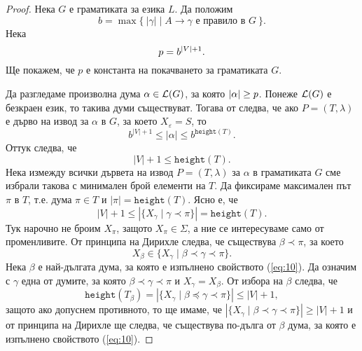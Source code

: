 \begin{proof}
  Нека $G$ е граматиката за езика $L$. Да положим
  \[b = \max\{\ |\gamma| \mid A \to \gamma \text{ е правило в }G\ \}.\]
  Нека
  \[p = b^{\vert{V}\vert + 1}.\]
  Ще покажем, че $p$ е константа на покачването за граматиката $G$.
  
  Да разгледаме произволна дума $\alpha \in \mathcal{L}(G)$, за която $\vert{\alpha}\vert \geq p$.
  Понеже $\mathcal{L}(G)$ е безкраен език, то такива думи съществуват.
  Тогава от  следва, че ако $P = (T,\lambda)$ е дърво на извод за $\alpha$ в $G$, за което $X_\varepsilon = S$, то
  \[b^{|V| + 1}\leq |\alpha| \leq b^{\texttt{height}(T)}.\]
  Оттук следва, че
  \[|V| + 1 \leq \texttt{height}(T).\]
  Нека измежду всички дървета на извод $P = (T,\lambda)$ за $\alpha$ в граматиката $G$ сме избрали такова с минимален брой елементи на $T$.
  Да фиксираме максимален път $\pi$ в $T$, т.е. дума $\pi \in T$ и $|\pi| = \texttt{height}(T)$.
  Ясно е, че
  \[|V| + 1 \leq |\{ X_\gamma \mid \gamma \prec \pi\}| = \texttt{height}(T).\]
  Тук нарочно не броим $X_\pi$, защото $X_\pi \in \Sigma$, а ние се интересуваме само от променливите.
  От принципа на Дирихле следва, че съществува $\beta \prec \pi$, за което
  \begin{equation}
    \label{eq:10}
    X_\beta \in \{X_\gamma \mid \beta \prec \gamma \prec \pi\}.
  \end{equation}
  Нека $\beta$ е най-дългата дума, за която е изпълнено свойството (\ref{eq:10}).
  Да означим с $\gamma$ една от думите, за която $\beta \prec \gamma \prec \pi$ и $X_\gamma = X_\beta$.
  От избора на $\beta$ следва, че
  \begin{equation}
    \label{eq:11}
    \texttt{height}(T_\beta) = |\{ X_\gamma \mid \beta \preceq \gamma \prec \pi\}| \leq |V| + 1,
  \end{equation}
  защото ако допуснем противното, то ще имаме, че $|\{ X_\gamma \mid \beta \prec \gamma \prec \pi\}| \geq |V| + 1$ и от принципа на Дирихле ще следва, че
  съществува по-дълга от $\beta$ дума, за която е изпълнено свойството (\ref{eq:10}).
  

\end{proof}
